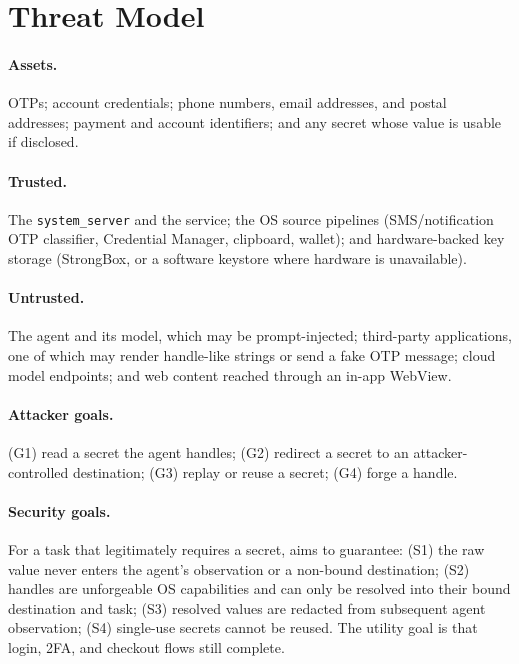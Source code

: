 \section{Threat Model}
\label{sec:threat}

\paragraph{Assets.} OTPs; account credentials; phone numbers, email addresses, and postal addresses; payment and account identifiers; and any secret whose value is usable if disclosed.

\paragraph{Trusted.} The \texttt{system\_server} and the \SH{} service; the OS source pipelines (SMS/notification OTP classifier, Credential Manager, clipboard, wallet); and hardware-backed key storage (StrongBox, or a software keystore where hardware is unavailable).

\paragraph{Untrusted.} The agent and its model, which may be prompt-injected; third-party applications, one of which may render handle-like strings or send a fake OTP message; cloud model endpoints; and web content reached through an in-app WebView.

\paragraph{Attacker goals.} (G1) read a secret the agent handles; (G2) redirect a secret to an attacker-controlled destination; (G3) replay or reuse a secret; (G4) forge a handle.

\paragraph{Security goals.} For a task that legitimately requires a secret, \SH{} aims to guarantee: (S1) the raw value never enters the agent's observation or a non-bound destination; (S2) handles are unforgeable OS capabilities and can only be resolved into their bound destination and task; (S3) resolved values are redacted from subsequent agent observation; (S4) single-use secrets cannot be reused. The utility goal is that login, 2FA, and checkout flows still complete.

